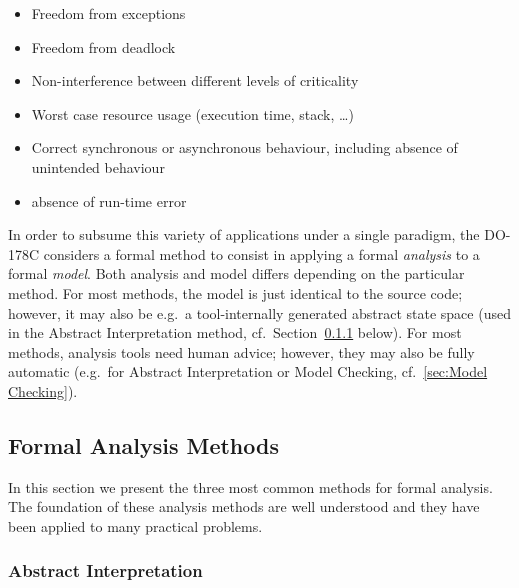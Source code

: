 \documentclass{template/openetcs_report}
\begin{document}
\begin{itemize}
\item Freedom from exceptions
\item Freedom from deadlock
\item Non-interference between different levels of criticality
\item Worst case resource usage (execution time, stack, \ldots)
\item Correct synchronous or asynchronous behaviour,
        including absence of unintended behaviour
\item absence of run-time error
\end{itemize}


In order to subsume this variety of applications under a single
paradigm,
the DO-178C
considers a formal method to consist in applying a
formal {\em analysis} to a formal {\em model}.
%
Both analysis and model differs depending on the particular method.
%
For most methods, the model
is just identical to the source code; however, it may
also be e.g.\ a tool-internally generated abstract state space (used
in the Abstract Interpretation method, cf.\
Section~\ref{sec:Abstract Interpretation} below).
%
For most methods, analysis tools need human advice;
however, they may also be fully automatic (e.g.\ for 
Abstract Interpretation or Model Checking, cf.\
\ref{sec:Model Checking}).

\subsection{Formal Analysis Methods}
\label{sec:formal-analysis}

In this section we present
the three most common methods for formal analysis.
The foundation of these analysis
methods are well understood and they have been
applied to many practical problems.


\subsubsection{Abstract Interpretation}
\label{sec:Abstract Interpretation}
\end{document}
